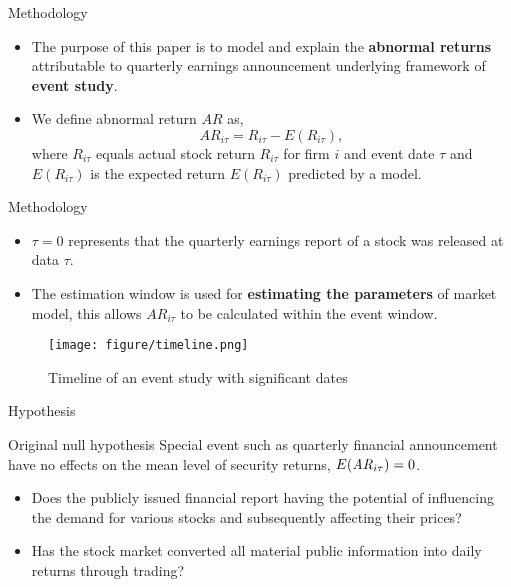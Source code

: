 \documentclass[
11pt,
ignorenonframetext,
]{beamer}
\begin{document}
\begin{frame}{Methodology}
\protect\hypertarget{methodology}{}

\begin{itemize}
\item
  The purpose of this paper is to model and explain the \textbf{abnormal
  returns} attributable to quarterly earnings announcement underlying
  framework of \textbf{event study}.
\item
  We define abnormal return \(AR\) as,
  \[AR_{i\tau} = R_{i\tau} - E(R_{i\tau}),\] where \(R_{i\tau}\) equals
  actual stock return \(R_{i\tau}\) for firm \(i\) and event date
  \(\tau\) and \(E(R_{i\tau})\) is the expected return \(E(R_{i\tau})\)
  predicted by a model.
\end{itemize}

\end{frame}

\begin{frame}{Methodology}
\protect\hypertarget{methodology-1}{}

\begin{itemize}
\item
  \(\tau = 0\) represents that the quarterly earnings report of a stock
  was released at data \(\tau\).
\item
  The estimation window is used for \textbf{estimating the parameters}
  of market model, this allows \(AR_{i\tau}\) to be calculated within
  the event window.
\end{itemize}

\begin{figure}
\centering
\texttt{[image: figure/timeline.png]}
\caption{Timeline of an event study with significant dates}
\end{figure}

\end{frame}

\begin{frame}{Hypothesis}
\protect\hypertarget{hypothesis}{}

\begin{block}{Original null hypothesis}
Special event such as quarterly financial announcement
have no effects on the mean level of security returns,
$E({\it AR}_{i\tau}) = 0$.
\end{block}

\begin{itemize}
\item
  Does the publicly issued financial report having the potential of
  influencing the demand for various stocks and subsequently affecting
  their prices?
\item
  Has the stock market converted all material public information into
  daily returns through trading?
\end{itemize}

\end{frame}
\end{document}
